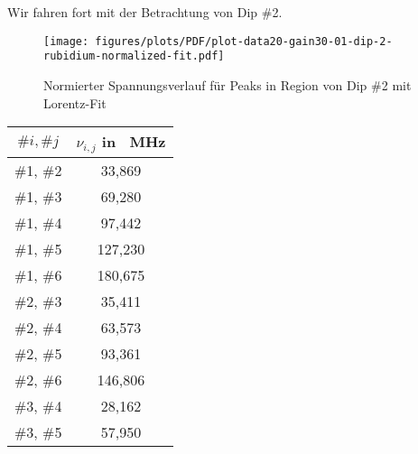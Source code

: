 \noindent Wir fahren fort mit der Betrachtung von Dip \textcolor{green!50!black}{\#2}.

\begin{figure}[H]
    \centering
    \texttt{[image: figures/plots/PDF/plot-data20-gain30-01-dip-2-rubidium-normalized-fit.pdf]}
    \caption{Normierter Spannungsverlauf für Peaks in Region von Dip \textcolor{green!50!black}{\#2} mit Lorentz-Fit}
    \label{fig:plot-data20-gain30-01-dip-2-rubidium-normalized-fit}
\end{figure}

\begin{table}[H]
    \begin{minipage}{8cm}
        \centering
        \begin{tabular}{|c|c|}
            \hline
            $\#i, \#j$      &       $\nu_{i,j}$ in \SI{}{\mega \hertz} \\
            \hline
            \hline
            \cellcolor{green!40} \#1, \#2       &   \cellcolor{green!40}     33,869         \\
            \hline
            \cellcolor{red!20}   \#1, \#3       &   \cellcolor{red!20}       69,280         \\
            \hline
            \cellcolor{gray!20}  \#1, \#4       &   \cellcolor{gray!20}      97,442         \\
            \hline
            \cellcolor{red!20}   \#1, \#5       &   \cellcolor{red!20}      127,230         \\
            \hline
            \cellcolor{gray!20}  \#1, \#6       &   \cellcolor{gray!20}     180,675         \\
            \hline
            \cellcolor{red!20}   \#2, \#3       &   \cellcolor{red!20}       35,411         \\
            \hline
            \cellcolor{green!40} \#2, \#4       &   \cellcolor{green!40}     63,573         \\
            \hline
            \cellcolor{red!20}   \#2, \#5       &   \cellcolor{red!20}       93,361         \\
            \hline
            \cellcolor{gray!20}  \#2, \#6       &   \cellcolor{gray!20}     146,806         \\
            \hline
            \cellcolor{red!20}   \#3, \#4       &   \cellcolor{red!20}       28,162         \\
            \hline
            \cellcolor{red!20}   \#3, \#5       &   \cellcolor{red!20}       57,950         \\

\end{tabular}
\end{minipage}
\end{table}
